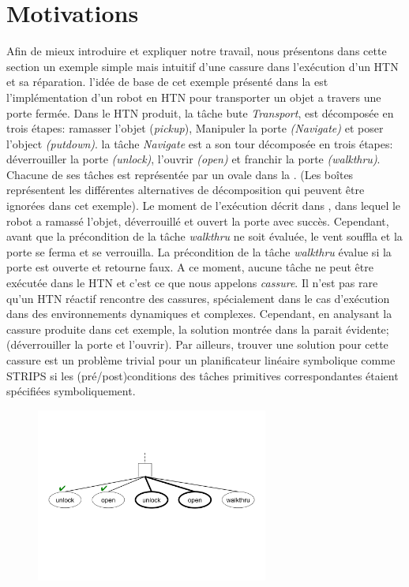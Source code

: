 \documentclass[a4paper,twoside,french]{article}
\begin{document}
		\section{Motivations}
		Afin de mieux introduire et expliquer notre travail, nous présentons dans cette section un exemple simple mais intuitif d'une cassure dans l'exécution d'un HTN et sa réparation. l'idée de base de cet exemple présenté dans la   est l'implémentation d'un robot en HTN pour transporter un objet a travers une porte fermée. Dans le HTN produit, la tâche bute {\em Transport}, est décomposée en trois étapes: ramasser l'objet ({\em pickup}), Manipuler la porte {\em(Navigate)} et poser l'object {\em(putdown)}. la tâche {\em Navigate} est a son tour décomposée en trois étapes: déverrouiller  la porte {\em(unlock)}, l'ouvrir {\em(open)} et franchir la porte {\em(walkthru)}. Chacune de ses tâches est représentée par un ovale dans la . (Les boîtes représentent les différentes alternatives de décomposition qui peuvent être ignorées dans cet exemple). Le moment de l'exécution décrit dans , dans lequel le robot a ramassé l'objet, déverrouillé et ouvert la porte avec succès. Cependant, avant que la précondition de la tâche {\em walkthru} ne soit évaluée, le vent souffla et la porte se ferma et se verrouilla. La précondition de la tâche {\em walkthru} évalue si la porte est ouverte et retourne faux. A ce moment, aucune tâche ne peut être exécutée dans le HTN et c'est ce que nous appelons {\em cassure}. Il n'est pas rare qu'un HTN réactif rencontre des cassures, spécialement dans le cas d'exécution dans des environnements dynamiques et complexes. Cependant, en analysant la cassure produite dans cet exemple, la solution montrée dans la  parait évidente; (déverrouiller la porte et l'ouvrir). Par ailleurs, trouver une solution pour cette cassure est un problème trivial pour un planificateur linéaire symbolique comme STRIPS si les (pré/post)conditions des tâches primitives correspondantes étaient spécifiées  symboliquement.
		
			\begin{figure}[t]
				\centerline{\includegraphics[width=3in]{figs/recover}}
				\vskip 8pt
			\end{figure}
	
\end{document}
